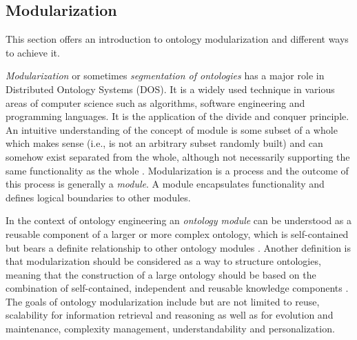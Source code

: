 


\newpage



\subsection{Modularization}
\label{modularization}
This section offers an introduction to ontology modularization and different ways to achieve it.

\emph{Modularization} or sometimes \emph{segmentation of ontologies}
has a major role in Distributed Ontology Systems (DOS).
It is a widely used technique in various areas of computer science
such as algorithms, software engineering and programming languages. It is the
application of the divide and conquer principle. An intuitive understanding of the concept
of module is some subset of a whole which makes sense (i.e., is not an arbitrary subset randomly built)
and can somehow exist separated from the whole, although not necessarily supporting
the same functionality as the whole \cite{Menken05d2.1.3.1report}. Modularization is a process
and the outcome of this process is generally a \emph{module}. A module encapsulates functionality
and defines logical boundaries to other modules.

In the context of ontology engineering an \emph{ontology module} can be understood as a
reusable component of a larger or more complex ontology, which is self-contained but bears a
definite relationship to other ontology modules \cite{doran08}. Another definition is that
modularization should be considered as a way to structure ontologies, meaning
that the construction of a large ontology should be based on the combination
of self-contained, independent and reusable knowledge components \cite{mathieu2007}.
The goals of ontology modularization include but are not limited to reuse,
scalability for information retrieval and reasoning as well as for evolution and
maintenance, complexity management, understandability and personalization.

